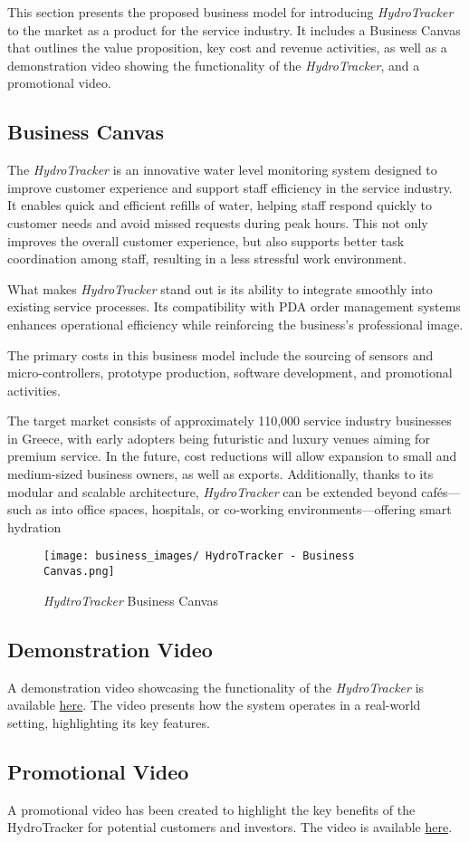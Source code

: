 This section presents the proposed business model for introducing \textit{HydroTracker} to the market as a product for the service industry. It includes a Business Canvas that outlines the value proposition, key cost and revenue activities, as well as a demonstration video showing the functionality of the \textit{HydroTracker}, and a promotional video.

\subsection{Business Canvas}
The \textit{HydroTracker} is an innovative water level monitoring system designed to improve customer experience and support staff efficiency in the service industry. It enables quick and efficient refills of water, helping staff respond quickly to customer needs and avoid missed requests during peak hours. This not only improves the overall customer experience, but also supports better task coordination among staff, resulting in a less stressful work environment.

What makes \textit{HydroTracker} stand out is its ability to integrate smoothly into existing service processes. Its compatibility with PDA order management systems enhances operational efficiency while reinforcing the business’s professional image. 

The primary costs in this business model include the sourcing of sensors and micro-controllers, prototype production, software development, and promotional activities.

The target market consists of approximately 110,000 service industry businesses in Greece, with early adopters being futuristic and luxury venues aiming for premium service. In the future, cost reductions will allow expansion to small and medium-sized business owners, as well as exports. Additionally, thanks to its modular and scalable architecture, \textit{HydroTracker} can be extended beyond cafés—such as into office spaces, hospitals, or co-working environments—offering smart hydration 

\begin{figure}[H]
    \centering
    \texttt{[image: business\_images/ HydroTracker - Business Canvas.png]}
    \caption{\textit{HydtroTracker} Business Canvas}
    \label{fig:enter-label}
\end{figure}

\subsection{Demonstration Video}
A demonstration video showcasing the functionality of the \textit{HydroTracker} is available \href{https://youtu.be/DthdfglUvXY?si=8oIWrk7Wovcrerfg}{here}. The video presents how the system operates in a real-world setting, highlighting its key features.

\subsection{Promotional Video}
A promotional video has been created to highlight the key benefits of the HydroTracker for potential customers and investors. The video is available \href{https://youtube.com}{here}.